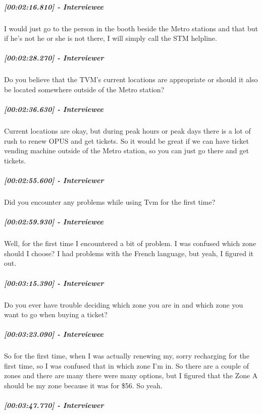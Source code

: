 \documentclass[a4paper,12pt]{article}
\begin{document}
\hypertarget{interviewee-11}{%
\subparagraph{{[}00:02:16.810{]} - Interviewee}\label{interviewee-11}}

I would just go to the person in the booth beside the Metro stations and
that but if he's not he or she is not there, I will simply call the STM
helpline.

\hypertarget{interviewer-12}{%
\subparagraph{{[}00:02:28.270{]} - Interviewer}\label{interviewer-12}}

Do you believe that the TVM's current locations are appropriate or
should it also be located somewhere outside of the Metro station?

\hypertarget{interviewee-12}{%
\subparagraph{{[}00:02:36.630{]} - Interviewee}\label{interviewee-12}}

Current locations are okay, but during peak hours or peak days there is
a lot of rush to renew OPUS and get tickets. So it would be great if we
can have ticket vending machine outside of the Metro station, so you can
just go there and get tickets.

\hypertarget{interviewer-13}{%
\subparagraph{{[}00:02:55.600{]} - Interviewer}\label{interviewer-13}}

Did you encounter any problems while using Tvm for the first time?

\hypertarget{interviewee-13}{%
\subparagraph{{[}00:02:59.930{]} - Interviewee}\label{interviewee-13}}

Well, for the first time I encountered a bit of problem. I was confused
which zone should I choose? I had problems with the French language, but
yeah, I figured it out.

\hypertarget{interviewer-14}{%
\subparagraph{{[}00:03:15.390{]} - Interviewer}\label{interviewer-14}}

Do you ever have trouble deciding which zone you are in and which zone
you want to go when buying a ticket?

\hypertarget{interviewee-14}{%
\subparagraph{{[}00:03:23.090{]} - Interviewee}\label{interviewee-14}}

So for the first time, when I was actually renewing my, sorry recharging
for the first time, so I was confused that in which zone I'm in. So
there are a couple of zones and there are many there were many options,
but I figured that the Zone A should be my zone because it was for \$56.
So yeah.

\hypertarget{interviewer-15}{%
\subparagraph{{[}00:03:47.770{]} - Interviewer}\label{interviewer-15}}
\end{document}
